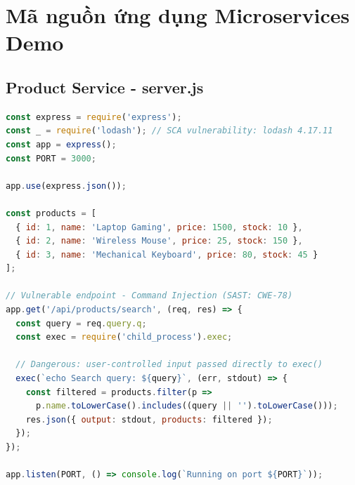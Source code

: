 \documentclass[12pt,a4paper]{report}
\begin{document}
\appendix
\chapter{Mã nguồn ứng dụng Microservices Demo}
\label{appendix:sourcecode}

\section{Product Service - server.js}
\begin{lstlisting}[language=JavaScript, caption={Mã nguồn Node.js Product Service (có lỗ hổng Command Injection)}]
const express = require('express');
const _ = require('lodash'); // SCA vulnerability: lodash 4.17.11
const app = express();
const PORT = 3000;

app.use(express.json());

const products = [
  { id: 1, name: 'Laptop Gaming', price: 1500, stock: 10 },
  { id: 2, name: 'Wireless Mouse', price: 25, stock: 150 },
  { id: 3, name: 'Mechanical Keyboard', price: 80, stock: 45 }
];

// Vulnerable endpoint - Command Injection (SAST: CWE-78)
app.get('/api/products/search', (req, res) => {
  const query = req.query.q;
  const exec = require('child_process').exec;
  
  // Dangerous: user-controlled input passed directly to exec()
  exec(`echo Search query: ${query}`, (err, stdout) => {
    const filtered = products.filter(p =>
      p.name.toLowerCase().includes((query || '').toLowerCase()));
    res.json({ output: stdout, products: filtered });
  });
});

app.listen(PORT, () => console.log(`Running on port ${PORT}`));
\end{lstlisting}
\end{document}
